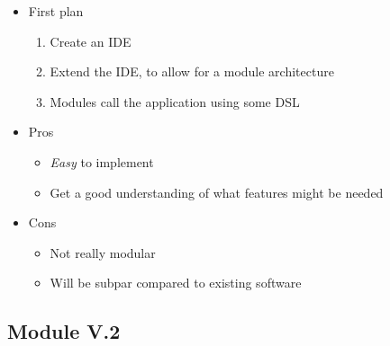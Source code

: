 \begin{itemize}
  \item First plan

    \begin{enumerate}
      \item Create an IDE

      \item Extend the IDE, to allow for a module architecture

      \item Modules call the application using some DSL

    \end{enumerate}
  \item Pros

    \begin{itemize}
      \item \textit{Easy} to implement

      \item Get a good understanding of what features might be needed

    \end{itemize}
  \item Cons

    \begin{itemize}
      \item Not really modular

      \item Will be subpar compared to existing software
    \end{itemize}
\end{itemize}

\subsection{Module V.2}


